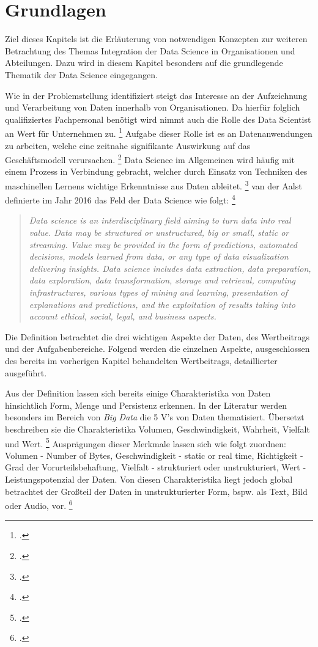 \chapter[Grundlagen]{Grundlagen}

Ziel dieses Kapitels ist die Erläuterung von notwendigen Konzepten zur weiteren Betrachtung des Themas Integration der Data Science in Organisationen und Abteilungen.
Dazu wird in diesem Kapitel besonders auf die grundlegende Thematik der Data Science eingegangen.

Wie in der Problemstellung identifiziert steigt das Interesse an der Aufzeichnung und Verarbeitung von Daten innerhalb von Organisationen. 
Da hierfür folglich qualifiziertes Fachpersonal benötigt wird nimmt auch die Rolle des Data Scientist an Wert für Unternehmen zu. \footcite[Vgl.][S. 1]{Fabijan.2017}
Aufgabe dieser Rolle ist es an Datenanwendungen zu arbeiten, welche eine zeitnahe signifikante Auswirkung auf das Geschäftsmodell verursachen. \footcite[Vgl.][S. 12]{Patil.2011}
Data Science im Allgemeinen wird häufig mit einem Prozess in Verbindung gebracht, welcher durch Einsatz von Techniken des maschinellen Lernens wichtige Erkenntnisse aus Daten ableitet. \footcite[Vgl.][S. 1]{Zhang.2020b}
van der Aalst definierte im Jahr 2016 das Feld der Data Science wie folgt: \footcite[][S. 10]{vanderAalst.2016}

\begin{quotation}
    \textit{
    Data science is an interdisciplinary ﬁeld aiming to turn data into real value.
    Data may be structured or unstructured, big or small, static or streaming.
    Value may be provided in the form of predictions, automated decisions, models learned from data, or any type of data visualization delivering insights.
    Data science includes data extraction, data preparation, data exploration, data transformation, storage and retrieval, computing infrastructures, various types of mining and learning, presentation of explanations and predictions, and the exploitation of results taking into account ethical, social, legal, and business aspects.    
    }
\end{quotation}

Die Definition betrachtet die drei wichtigen Aspekte der Daten, des Wertbeitrags und der Aufgabenbereiche.
Folgend werden die einzelnen Aspekte, ausgeschlossen des bereits im vorherigen Kapitel behandelten Wertbeitrags, detaillierter ausgeführt.

Aus der Definition lassen sich bereits einige Charakteristika von Daten hinsichtlich Form, Menge und Persistenz erkennen.
In der Literatur werden besonders im Bereich von \textit{Big Data} die 5 V's von Daten thematisiert.
Übersetzt beschreiben sie die Charakteristika Volumen, Geschwindigkeit, Wahrheit, Vielfalt und Wert. \footcite[Vgl.][S. 1]{Naeem.2022}
Ausprägungen dieser Merkmale lassen sich wie folgt zuordnen: Volumen - Number of Bytes, Geschwindigkeit - static or real time, Richtigkeit - Grad der Vorurteilsbehaftung, Vielfalt - strukturiert oder unstrukturiert, Wert - Leistungspotenzial der Daten.
Von diesen Charakteristika liegt jedoch global betrachtet der Großteil der Daten in unstrukturierter Form, bspw. als Text, Bild oder Audio, vor. \footcite[Vgl.][S. 4]{vanderAalst.2016}

